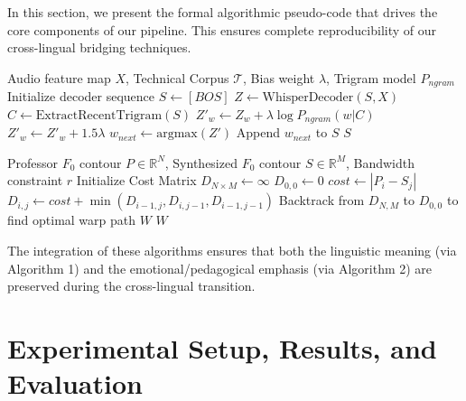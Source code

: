 \documentclass[conference]{IEEEtran}
\begin{document}
In this section, we present the formal algorithmic pseudo-code that drives the core components of our pipeline. This ensures complete reproducibility of our cross-lingual bridging techniques.

\begin{algorithm}[H]
\caption{Logit-Biased Constrained Decoding}
\begin{algorithmic}[1]
\REQUIRE Audio feature map $X$, Technical Corpus $\mathcal{T}$, Bias weight $\lambda$, Trigram model $P_{ngram}$
\STATE Initialize decoder sequence $S \leftarrow [BOS]$
    \STATE $Z \leftarrow \text{WhisperDecoder}(S, X)$ 
    \STATE $C \leftarrow \text{ExtractRecentTrigram}(S)$
        \STATE $Z'_w \leftarrow Z_w + \lambda \log P_{ngram}(w | C)$
            \STATE $Z'_w \leftarrow Z'_w + 1.5 \lambda$ 
        \ENDIF
    \ENDFOR
    \STATE $w_{next} \leftarrow \text{argmax}(Z')$
    \STATE Append $w_{next}$ to $S$
\ENDWHILE
\RETURN $S$
\end{algorithmic}
\end{algorithm}

\begin{algorithm}[H]
\caption{Sakoe-Chiba Constrained FastDTW Prosody Warping}
\begin{algorithmic}[1]
\REQUIRE Professor $F_0$ contour $P \in \mathbb{R}^N$, Synthesized $F_0$ contour $S \in \mathbb{R}^M$, Bandwidth constraint $r$
\STATE Initialize Cost Matrix $D_{N \times M} \leftarrow \infty$
\STATE $D_{0,0} \leftarrow 0$
        \STATE $cost \leftarrow |P_i - S_j|$
        \STATE $D_{i,j} \leftarrow cost + \min(D_{i-1,j}, D_{i,j-1}, D_{i-1,j-1})$
    \ENDFOR
\ENDFOR
\STATE Backtrack from $D_{N,M}$ to $D_{0,0}$ to find optimal warp path $W$
\RETURN $W$
\end{algorithmic}
\end{algorithm}

The integration of these algorithms ensures that both the linguistic meaning (via Algorithm 1) and the emotional/pedagogical emphasis (via Algorithm 2) are preserved during the cross-lingual transition.

\section{Experimental Setup, Results, and Evaluation}
\end{document}

